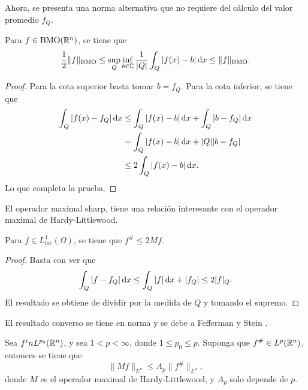 Ahora, se presenta una norma alternativa que no requiere del cálculo del valor promedio $f_Q$.
\begin{proposition}
	Para $f\in \mathrm{BMO}(\mathbb{R}^n)$, se tiene que 
	\begin{equation*}
		\frac{1}{2}\|f\|_{\mathrm{BMO}} \leq \sup_Q \inf_{b\in\mathbb{C}}\frac{1}{|Q|} \int_Q |f(x)-b|\mathop{}\!\mathrm{d} x \leq \|f\|_{\mathrm{BMO}} . 
	\end{equation*}
\end{proposition}
\begin{proof}
	Para la cota superior basta tomar $b=f_Q$. Para la cota inferior, se tiene que
	\begin{align*}
		\int_Q |f(x) - f_Q|\mathop{}\!\mathrm{d} x & \leq \int_Q |f(x) - b| \mathop{}\!\mathrm{d} x + \int_Q |b- f_Q|\mathop{}\!\mathrm{d} x \\
		& =  \int_Q |f(x) - b| \mathop{}\!\mathrm{d} x + |Q||b-f_Q| \\
		& \leq 2 \int_Q |f(x) - b|\mathop{}\!\mathrm{d} x.
	\end{align*}
	Lo que completa la prueba.
\end{proof}
El operador maximal sharp, tiene una relación interesante con el operador maximal de Hardy-Littlewood.
\begin{theorem}
	Para $f\in L^1_{loc}(\Omega)$, se tiene que $f^\# \leq 2Mf$.
\end{theorem}
\begin{proof}
	Basta con ver que 
	\begin{equation*}
		\int_Q|f-f_Q| \mathop{}\!\mathrm{d} x \leq \int_Q |f|\mathop{}\!\mathrm{d} x + |f_Q| \leq 2|f|_Q.
	\end{equation*}
	El resultado se obtiene de dividir por la medida de $Q$ y tomando el supremo.
\end{proof}
El resultado converso se tiene en norma y se debe a Fefferman y Stein \cite{fefferman-stein}.
\begin{theorem}\label{theo:sharp-hardy-littlewood}
	Sea $f^in L^{p_0}(\mathbb{R}^n)$, y sea $1<p<\infty$, donde $1\leq p_0\leq p$. Suponga que $f^\#\in L^p(\mathbb{R}^n)$, entonces se tiene que 
	\begin{equation*}
		\|Mf\|_{L^p} \leq A_p \|f^\#\|_{L^p},
	\end{equation*}
	donde $M$ es el operador maximal de Hardy-Littlewood, y $A_p$ solo depende de $p$.
\end{theorem}
